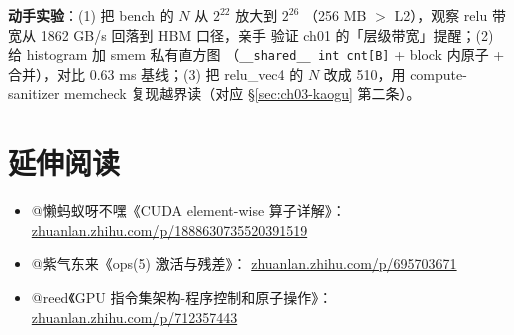 \textbf{动手实验}：(1) 把 bench 的 $N$ 从 $2^{22}$ 放大到 $2^{26}$
（256 MB $>$ L2），观察 relu 带宽从 1862 GB/s 回落到 HBM 口径，亲手
验证 ch01 的「层级带宽」提醒；(2) 给 histogram 加 smem 私有直方图
（\texttt{\_\_shared\_\_ int cnt[B]} + block 内原子 + 合并），对比
0.63 ms 基线；(3) 把 relu\_vec4 的 $N$ 改成 510，用 compute-sanitizer
memcheck 复现越界读（对应 \S\ref{sec:ch03-kaogu} 第二条）。

\section*{延伸阅读}
\begin{itemize}
\item @懒蚂蚁呀不嘿《CUDA element-wise 算子详解》：
  \href{https://zhuanlan.zhihu.com/p/1888630735520391519}{zhuanlan.zhihu.com/p/1888630735520391519}
\item @紫气东来《ops(5) 激活与残差》：
  \href{https://zhuanlan.zhihu.com/p/695703671}{zhuanlan.zhihu.com/p/695703671}
\item @reed《GPU 指令集架构-程序控制和原子操作》：
  \href{https://zhuanlan.zhihu.com/p/712357443}{zhuanlan.zhihu.com/p/712357443}
\end{itemize}

